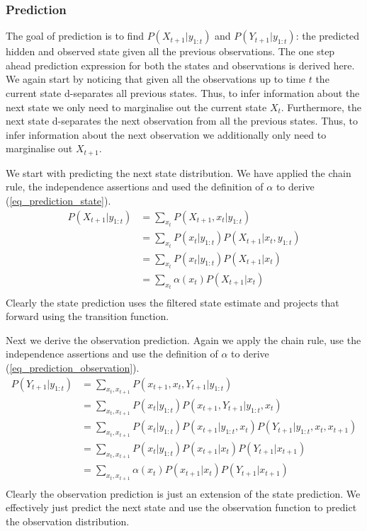 \documentclass[../masters.tex]{subfiles}
\begin{document}
\subsubsection{Prediction}
The goal of prediction is to find $P(X_{t+1}|y_{1:t})$ and $P(Y_{t+1}|y_{1:t})$: the predicted hidden and observed state given all the previous observations. The one step ahead prediction expression for both the states and observations is derived here. We again start by noticing that given all the observations  up to time $t$ the current state d-separates  all previous states. Thus, to infer information about the next state we only need to marginalise out the current state $X_t$. Furthermore, the next state d-separates the next observation from all the previous states. Thus, to infer information about the next observation we additionally only need to marginalise out $X_{t+1}$.

We start with predicting the next state distribution. We have applied the chain rule, the independence assertions and used the definition of $\alpha$ to derive (\ref{eq_prediction_state}).
\begin{equation}
\begin{aligned}
P(X_{t+1}|y_{1:t}) &= \sum_{x_t} P(X_{t+1}, x_t|y_{1:t}) \\
&= \sum_{x_t} P(x_t|y_{1:t})P(X_{t+1}|x_t, y_{1:t}) \\
&= \sum_{x_t} P(x_t|y_{1:t})P(X_{t+1}|x_t) \\
&= \sum_{x_t} \alpha(x_t)P(X_{t+1}|x_t) \\
\end{aligned}
\label{eq_prediction_state}
\end{equation}
Clearly the state prediction uses the filtered state estimate and projects that forward using the transition function.

Next we derive the observation prediction. Again we apply the chain rule, use the independence assertions and use the definition of $\alpha$ to derive (\ref{eq_prediction_observation}).
\begin{equation}
\begin{aligned}
P(Y_{t+1}|y_{1:t}) &= \sum_{x_t, x_{t+1}} P(x_{t+1}, x_t, Y_{t+1}|y_{1:t})\\
&= \sum_{x_t, x_{t+1}} P(x_t|y_{1:t})P(x_{t+1}, Y_{t+1}|y_{1:t}, x_t) \\
&= \sum_{x_t, x_{t+1}} P(x_t|y_{1:t})P(x_{t+1}|y_{1:t}, x_t)P(Y_{t+1}|y_{1:t}, x_t, x_{t+1}) \\
&= \sum_{x_t, x_{t+1}} P(x_t|y_{1:t})P(x_{t+1}|x_t)P(Y_{t+1}|x_{t+1}) \\
&= \sum_{x_t, x_{t+1}} \alpha(x_t)P(x_{t+1}|x_t)P(Y_{t+1}|x_{t+1}) \\
\end{aligned}
\label{eq_prediction_observation}
\end{equation}
Clearly the observation prediction is just an extension of the state prediction. We effectively just predict the next state and use the observation function to predict the observation distribution.
\end{document}

